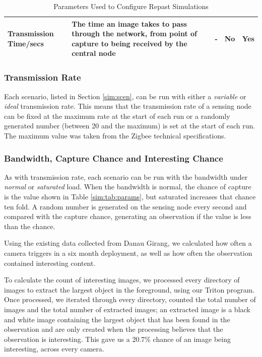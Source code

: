 \begin{landscape}
\begin{table}
\begin{tabularx}{\textwidth}{|p{4cm}|p{10cm}|p{3cm}|p{2cm}|p{2cm}|}
	Transmission Time/secs                       & The time an image takes to pass through the network, from point of capture to being received by the central node            & -                   & No                 & Yes      \\
	\bottomrule         
	\end{tabularx}
	\caption{Parameters Used to Configure Repast Simulations}
	\end{table}
    \label{sim:tab:params}
	\end{landscape}

	\subsubsection{Transmission Rate}
	Each scenario, listed in Section \ref{sim:scen}, can be run with either a \textit{variable} or \textit{ideal} transmission rate. This means that the transmission rate of a sensing node can be fixed at the maximum rate at the start of each run or a randomly generated number (between 20 and the maximum) is set at the start of each run. The maximum value was taken from the Zigbee technical specifications.


	\subsubsection{Bandwidth, Capture Chance and Interesting Chance}
	As with transmission rate, each scenario can be run with the bandwidth under \textit{normal} or \textit{saturated} load. When the bandwidth is normal, the chance of capture is the value shown in Table \ref{sim:tab:params}, but saturated increases that chance ten fold. A random number is generated on the sensing node every second and compared with the capture chance, generating an observation if the value is less than the chance. 

	Using the existing data collected from Danau Girang, we calculated how often a camera triggers in a six month deployment, as well as how often the observation contained interesting content. 
	
	To calculate the count of interesting images, we processed every directory of images to extract the largest object in the foreground, using our Triton program. Once processed, we iterated through every directory, counted the total number of images and the total number of extracted images; an extracted image is a black and white image containing the largest object that has been found in the observation and are only created when the processing believes that the observation is interesting. This gave us a 20.7\% chance of an image being interesting, across every camera.
	
